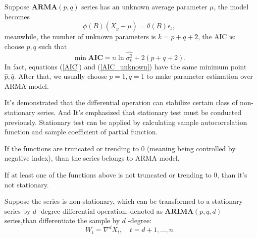 \documentclass{mcmthesis}
\numberwithin{figure}{section}
\numberwithin{table}{section}
\numberwithin{equation}{section}
\begin{document}
\par
Suppose $ \mathbf{ARMA}(p,q) $ series has an unknown average parameter $ \mu $,
the model becomes
$$
  \phi(B)(X_y-\mu) = \theta(B)\epsilon_t,
$$   
meanwhile, the number of unknown parameters is $ k = p+q+2 $, the AIC is:
choose $ p,q $ such that
\begin{equation}\label{AIC_unknown}
  \min \mathbf{AIC} = n\ln\hat{\sigma_\epsilon^2}+2(p+q+2).
\end{equation}  
In fact, equations (\ref{AIC}) and (\ref{AIC_unknown}) have the same minimum point $ \hat{p},\hat{q} $.
After that, we usually choose $ p = 1, q = 1 $ to make parameter estimation 
over ARMA model.
\par
It's demonstrated that the differential operation can stabilize 
certain class of non-stationary series. And It's emphasized that 
stationary test must be conducted previously. Stationary test can 
be applied by calculating sample autocorrelation function and 
sample coefficient of partial function. 
\par
If the functions are truncated or trending to 0 (meaning being controlled
by negative index), than the series belongs to ARMA model.
\par
If at least one of the functions above is not truncated or trending to 0, than
it's not stationary.
\par
Suppose the series is non-stationary, which can be transformed to 
a stationary series by $ d $ -degree differential operation, denoted
as $ \mathbf{ARIMA}(p,q,d) $ series,than differentiate the sample by
$ d $ -degree:
$$
  W_t = \nabla^dX_t,\quad t = d+1,\dots , n
$$ 
\end{document}
